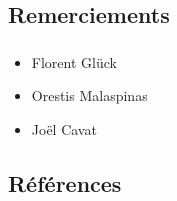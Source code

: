 \documentclass[10pt]{beamer}
\begin{document}
\subsection{Remerciements}
\begin{frame}
    \frametitle{\subsecname}
    \begin{itemize}
        \item Florent Glück
        \item Orestis Malaspinas
        \item Joël Cavat
    \end{itemize}
\end{frame}

\subsection{Références}
\begin{frame}[allowframebreaks]
    \frametitle{\subsecname}
	
	
\end{frame}
\end{document}
